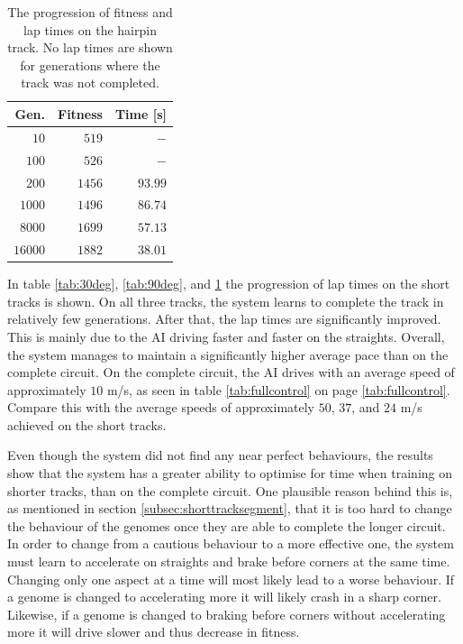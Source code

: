 \begin{table}[H] 
  \centering
  \begin{tabular}{rrr}
            \toprule
            Gen. & Fitness & Time [s]\\
            \midrule
            $10$    & $519$     & $-$       \\
            $100$   & $526$     & $-$       \\
            $200$   & $1456$    & $93.99$   \\
            $1000$  & $1496$    & $86.74$   \\
            $8000$  & $1699$    & $57.13$   \\
            $16000$ & $1882$    & $38.01$   \\
            \bottomrule
        \end{tabular}
  \caption{The progression of fitness and lap times on the hairpin track. No lap times are shown for generations where the track was not completed.}
  \label{tab:180deg}
\end{table}

\noindent
In table \ref{tab:30deg}, \ref{tab:90deg}, and \ref{tab:180deg} the progression of lap times on the short tracks is shown. On all three tracks, the system learns to complete the track in relatively few generations. After that, the lap times are significantly improved. This is mainly due to the AI driving faster and faster on the straights. Overall, the system manages to maintain a significantly higher average pace than on the complete circuit. On the complete circuit, the AI drives with an average speed of approximately $10$ m/s, as seen in table \ref{tab:fullcontrol} on page \ref{tab:fullcontrol}. Compare this with the average speeds of approximately $50$, $37$, and $24$ m/s achieved on the short tracks. 

Even though the system did not find any near perfect behaviours, the results show that the system has a greater ability to optimise for time when training on shorter tracks, than on the complete circuit. One plausible reason behind this is, as mentioned in section \ref{subsec:shorttracksegment}, that it is too hard to change the behaviour of the genomes once they are able to complete the longer circuit. In order to change from a cautious behaviour to a more effective one, the system must learn to accelerate on straights and brake before corners at the same time. Changing only one aspect at a time will most likely lead to a worse behaviour. If a genome is changed to accelerating more it will likely crash in a sharp corner. Likewise, if a genome is changed to braking before corners without accelerating more it will drive slower and thus decrease in fitness.

